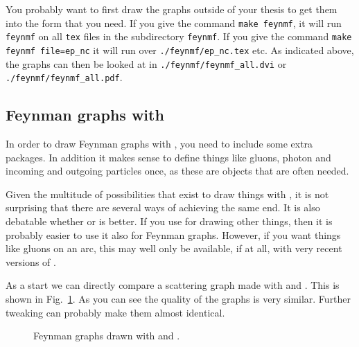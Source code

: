 You probably want to first draw the graphs outside of your thesis to
get them into the form that you need. If you give the command
\texttt{make feynmf}, it will run \texttt{feynmf} on all \texttt{tex}
files in the subdirectory \texttt{feynmf}. If you give the command
\texttt{make feynmf file=ep\_nc} it will run over
\texttt{./feynmf/ep\_nc.tex} etc. As indicated above, the graphs can
then be looked at in \texttt{./feynmf/feynmf\_all.dvi} or\\
\texttt{./feynmf/feynmf\_all.pdf}.


\subsection{Feynman graphs with \TikZ}
\label{sec:fig:feynman:tikz}

In order to draw Feynman graphs with \TikZ, you need to include some
extra \TikZ packages. In addition it makes sense to define things like
gluons, photon and incoming and outgoing particles once, as these are
objects that are often needed.

Given the multitude of possibilities that exist to draw things with
\TikZ, it is not surprising that there are several ways of achieving the
same end. It is also debatable whether  or 
is better. If you use \TikZ for drawing other things, then it is
probably easier to use it also for Feynman graphs. However, if you
want things like gluons on an arc, this may well only be available, if
at all, with very recent versions of .

As a start we can directly compare a scattering graph made with
 and . This is shown in
Fig.~\ref{fig:feyn:cf}. As you can see the quality of the graphs is
very similar. Further tweaking can probably make them almost
identical.

\begin{figure}[htbp]
  \centering
  \qquad
  \caption{Feynman graphs drawn with  and .}
  \label{fig:feyn:cf}
\end{figure}


